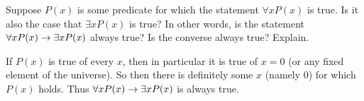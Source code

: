 \begin{questions}

  \begin{answer}
  \end{answer}



\question Suppose $P(x)$ is some predicate for which the statement $\forall x P(x)$ is true.  Is it also the case that $\exists x P(x)$ is true?  In other words, is the statement $\forall x P(x) \rightarrow \exists x P(x)$ always true?  Is the converse always true?  Explain.

	\begin{answer}
	  If $P(x)$ is true of every $x$, then in particular it is true of $x = 0$ (or any fixed element of the universe).  So then there is definitely some $x$ (namely 0) for which $P(x)$ holds.  Thus $\forall x P(x) \rightarrow \exists x P(x)$ is always true.


\end{answer}
\end{questions}
